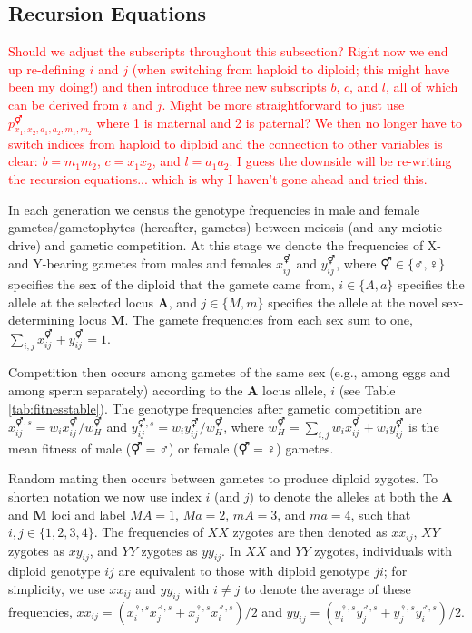 \documentclass[12pt]{article}
\begin{document}
\subsection*{Recursion Equations}
\label{app:recurs}

\textcolor{red}{Should we adjust the subscripts throughout this subsection? Right now we end up re-defining $i$ and $j$ (when switching from haploid to diploid; this might have been my doing!) and then introduce three new subscripts $b$, $c$, and $l$, all of which can be derived from $i$ and $j$. Might be more straightforward to just use $p^\Hermaphrodite_{x_1,x_2,a_1,a_2,m_1,m_2}$ where 1 is maternal and 2 is paternal? We then no longer have to switch indices from haploid to diploid and the connection to other variables is clear: $b=m_1m_2$, $c=x_1x_2$, and $l=a_1a_2$. I guess the downside will be re-writing the recursion equations... which is why I haven't gone ahead and tried this.}

In each generation we census the genotype frequencies in male and female gametes/gametophytes (hereafter, gametes) between meiosis (and any meiotic drive) and gametic competition. 
At this stage we denote the frequencies of X- and Y-bearing gametes from males and females $x_{ij}^{\Hermaphrodite}$ and $y_{ij}^{\Hermaphrodite}$, where $\Hermaphrodite \in \{\male,\female\}$ specifies the sex of the diploid that the gamete came from, $i\in\{A,a\}$ specifies the allele at the selected locus $\mathbf{A}$, and $j\in\{M,m\}$ specifies the allele at the novel sex-determining locus $\mathbf{M}$. 
The gamete frequencies from each sex sum to one, $\sum_{i,j}x_{ij}^{\Hermaphrodite}+y_{ij}^{\Hermaphrodite}=1$. 

Competition then occurs among gametes of the same sex (e.g., among eggs and among sperm separately) according to the \textbf{A} locus allele, $i$ (see Table \ref{tab:fitnesstable}).
The genotype frequencies after gametic competition are $x_{ij}^{\Hermaphrodite,s}= w_{i}x_{ij}^{\Hermaphrodite}/\bar{w}_{H}^{\Hermaphrodite}$ and $y_{ij}^{\Hermaphrodite,s}= w_{i}y_{ij}^{\Hermaphrodite}/\bar{w}_{H}^{\Hermaphrodite}$, where $\bar{w}_{H}^{\Hermaphrodite}=\sum_{i,j} w_{i}x_{ij}^{\Hermaphrodite}+w_{i}y_{ij}^{\Hermaphrodite}$ is the mean fitness of male ($\Hermaphrodite=\male$) or female ($\Hermaphrodite=\female$) gametes. 

Random mating then occurs between gametes to produce diploid zygotes.
To shorten notation we now use index $i$ (and $j$) to denote the alleles at both the $\mathbf{A}$ and $\mathbf{M}$ loci and label $MA=1$, $Ma=2$, $mA=3$, and $ma=4$, such that $i,j\in\{1,2,3,4\}$.
The frequencies of $XX$ zygotes are then denoted as $xx_{ij}$, $XY$ zygotes as $xy_{ij}$, and $YY$ zygotes as $yy_{ij}$. 
In $XX$ and $YY$ zygotes, individuals with diploid genotype $ij$ are equivalent to those with diploid genotype $ji$; for simplicity, we use $xx_{ij}$ and $yy_{ij}$ with $i\neq j$ to denote the average of these frequencies, $xx_{ij}=(x_{i}^{\female,s}x_{j}^{\male,s}+x_{j}^{\female,s}x_{i}^{\male,s})/2$ and $yy_{ij}=(y_{i}^{\female,s}y_{j}^{\male,s}+y_{j}^{\female,s}y_{i}^{\male,s})/2$. 
\end{document}
